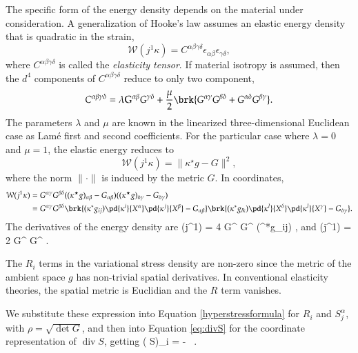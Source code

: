 \documentclass[smallextended]{svjour3}
\begin{document}
The specific form of the energy density depends on the material under consideration. 
A generalization of Hooke's law assumes an elastic energy density that is quadratic in the strain,
\[
{\mathcal{W}}(j^1\kappa) = C^{\alpha\beta\gamma\delta} \epsilon_{\alpha\beta} \epsilon_{\gamma\delta},
\]
where $C^{\alpha\beta\gamma\delta}$ is called the \emph{elasticity tensor}. If material isotropy is assumed, then the $d^4$ components of $C^{\alpha\beta\gamma\delta}$ reduce to only two component, 
\[
C^{\alpha\beta\gamma\delta} = \lambda {\mathrm{G}}^{\alpha\beta} G^{\gamma\delta} + \frac{\mu}{2} \brk{G^{\alpha\gamma} G^{\beta\delta} + G^{\alpha\delta} G^{\beta\gamma}}.
\]
The parameters $\lambda$ and $\mu$ are known in the linearized three-dimensional Euclidean case as Lam\'e first and second coefficients.
For the particular case where $\lambda=0$ and $\mu=1$, the elastic energy reduces to
\[
{\mathcal{W}}(j^1\kappa)= \|\kappa^\star g-G\|^2,
\]
where the norm $\|\cdot\|$ is induced by the metric $G$.
In coordinates,
\[
\begin{split}
{\mathcal{W}}(j^1\kappa) &= G^{\alpha \gamma} G^{\beta \delta} ((\kappa^\star g)_{\alpha \beta} - G_{\alpha \beta})((\kappa^\star g)_{\delta\gamma} - G_{\delta\gamma} )\\
&= G^{\alpha \gamma} G^{\beta \delta} 
\brk{(\kappa^*g_{ij})\pd{\kappa^i}{X^\alpha}\pd{\kappa^j}{X^\beta} - G_{\alpha \beta}}
\brk{(\kappa^*g_{lk})\pd{\kappa^l}{X^\delta}\pd{\kappa^l}{X^\gamma} - G_{\delta\gamma}}.
\end{split}
\]
The derivatives of the energy density are
\beq
\label{verder1}
(j^1\kappa) = 4 G^{\alpha \gamma} G^{\beta \delta} 
(\kappa^*g_{ij}) 
,
\eeq
and
\beq
\label{verder2}
(j^1\kappa) = 2 G^{\alpha \gamma} G^{\beta \delta} 
.
\eeq
\begin{remark}
The $R_i$ terms in the variational stress density are non-zero since the metric of the ambient space  $g$ has non-trivial spatial derivatives. In conventional elasticity theories, the spatial metric is Euclidian and the $R$ term vanishes.
\end{remark}

We substitute these expression into Equation \eqref{hyperstressformula} for $R_i$ and $S_j^\alpha$, with $\rho = \sqrt{\det G}$, and then into Equation \eqref{eq:divS} for the coordinate representation of $\operatorname{div} S$, getting
\beq
\label{divhyper}
( S)_i = 
 - \, .
\eeq
\end{document}
